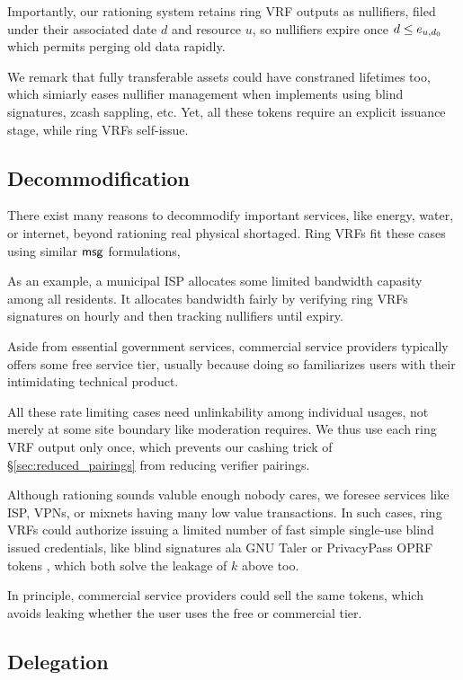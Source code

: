 Importantly, our rationing system retains ring VRF outputs as nullifiers,
filed under their associated date $d$ and resource $u$, so nullifiers
expire once $d \le e_{u,d_0}$ which permits perging old data rapidly.

We remark that fully transferable assets could have constraned lifetimes
too, which simiarly eases nullifier management when implements using
blind signatures, zcash sappling, etc.  Yet, all these tokens require
an explicit issuance stage, while ring VRFs self-issue.


\subsection{Decommodification}

There exist many reasons to decommodify important services,
like energy, water, or internet,
 beyond rationing real physical shortaged.
Ring VRFs fit these cases using similar $\mathsf{msg}$ formulations,

As an example, a municipal ISP allocates some limited bandwidth capasity
among all residents.  It allocates bandwidth fairly by verifying ring VRFs
signatures on hourly \msg and then tracking nullifiers until expiry.

Aside from essential government services, commercial service providers
typically offers some free service tier, usually because doing so
familiarizes users with their intimidating technical product.


All these rate limiting cases need unlinkability among individual
usages, not merely at some site boundary like moderation requires.
We thus use each ring VRF output only once, which prevents our cashing
trick of \S\ref{sec:reduced_pairings} from reducing verifier pairings.

Although rationing sounds valuble enough nobody cares, we foresee
services like ISP, VPNs, or mixnets having many low value transactions.
In such cases, ring VRFs could authorize issuing a limited number of
fast simple single-use blind issued credentials, like blind signatures
ala GNU Taler \cite{taler} or PrivacyPass OPRF tokens \cite{PrivacyPass},
 which both solve the leakage of $k$ above too.

In principle, commercial service providers could sell the same tokens,
which avoids leaking whether the user uses the free or commercial tier.


\subsection{Delegation}


